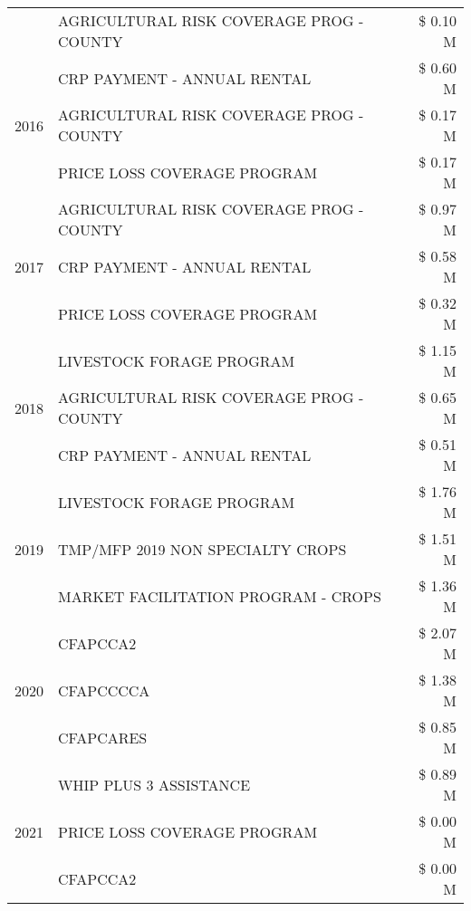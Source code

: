 \begin{tabular}{llr}
 & AGRICULTURAL RISK COVERAGE PROG - COUNTY & \$ 0.10 M \\
\cline{1-3}
\multirow[t]{3}{*}{2016} & CRP PAYMENT - ANNUAL RENTAL & \$ 0.60 M \\
 & AGRICULTURAL RISK COVERAGE PROG - COUNTY & \$ 0.17 M \\
 & PRICE LOSS COVERAGE PROGRAM & \$ 0.17 M \\
\cline{1-3}
\multirow[t]{3}{*}{2017} & AGRICULTURAL RISK COVERAGE PROG - COUNTY & \$ 0.97 M \\
 & CRP PAYMENT - ANNUAL RENTAL & \$ 0.58 M \\
 & PRICE LOSS COVERAGE PROGRAM & \$ 0.32 M \\
\cline{1-3}
\multirow[t]{3}{*}{2018} & LIVESTOCK FORAGE PROGRAM & \$ 1.15 M \\
 & AGRICULTURAL RISK COVERAGE PROG - COUNTY & \$ 0.65 M \\
 & CRP PAYMENT - ANNUAL RENTAL & \$ 0.51 M \\
\cline{1-3}
\multirow[t]{3}{*}{2019} & LIVESTOCK FORAGE PROGRAM & \$ 1.76 M \\
 & TMP/MFP 2019 NON SPECIALTY CROPS & \$ 1.51 M \\
 & MARKET FACILITATION PROGRAM - CROPS & \$ 1.36 M \\
\cline{1-3}
\multirow[t]{3}{*}{2020} & CFAPCCA2 & \$ 2.07 M \\
 & CFAPCCCCA & \$ 1.38 M \\
 & CFAPCARES & \$ 0.85 M \\
\cline{1-3}
\multirow[t]{3}{*}{2021} & WHIP PLUS 3 ASSISTANCE & \$ 0.89 M \\
 & PRICE LOSS COVERAGE PROGRAM & \$ 0.00 M \\
 & CFAPCCA2 & \$ 0.00 M \\
\cline{1-3}
\bottomrule
\end{tabular}
